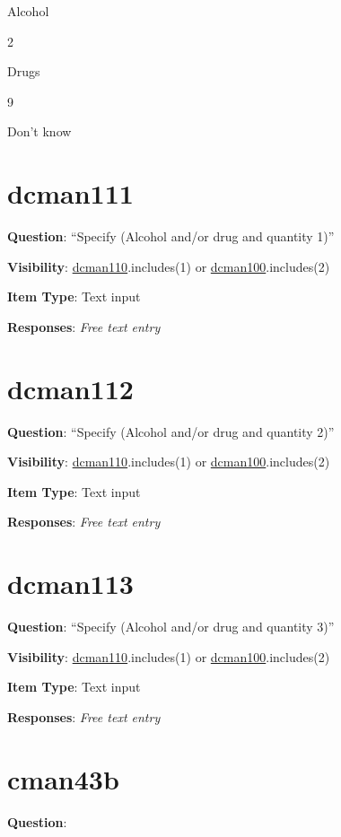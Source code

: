 \documentclass[]{book}
\begin{document}
Alcohol

2

Drugs

9

Don't know

\hypertarget{dcman111}{%
\section{dcman111}\label{dcman111}}

\textbf{Question}: ``Specify (Alcohol and/or drug and quantity 1)''

\textbf{Visibility}: \protect\hyperlink{dcman110}{dcman110}.includes(1) or \protect\hyperlink{dcman100}{dcman100}.includes(2)

\textbf{Item Type}: Text input

\textbf{Responses}: \emph{Free text entry}

\hypertarget{dcman112}{%
\section{dcman112}\label{dcman112}}

\textbf{Question}: ``Specify (Alcohol and/or drug and quantity 2)''

\textbf{Visibility}: \protect\hyperlink{dcman110}{dcman110}.includes(1) or \protect\hyperlink{dcman100}{dcman100}.includes(2)

\textbf{Item Type}: Text input

\textbf{Responses}: \emph{Free text entry}

\hypertarget{dcman113}{%
\section{dcman113}\label{dcman113}}

\textbf{Question}: ``Specify (Alcohol and/or drug and quantity 3)''

\textbf{Visibility}: \protect\hyperlink{dcman110}{dcman110}.includes(1) or \protect\hyperlink{dcman100}{dcman100}.includes(2)

\textbf{Item Type}: Text input

\textbf{Responses}: \emph{Free text entry}

\hypertarget{cman43b}{%
\section{cman43b}\label{cman43b}}

\textbf{Question}:
\end{document}
